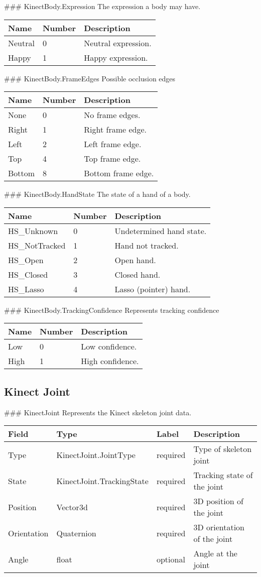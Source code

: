  \#\#\# KinectBody.Expression The expression a body may have.

\begin{longtable}[c]{@{}lll@{}}
\toprule
Name & Number & Description\tabularnewline
\midrule
\endhead
Neutral & 0 & Neutral expression.\tabularnewline
Happy & 1 & Happy expression.\tabularnewline
\bottomrule
\end{longtable}

 \#\#\# KinectBody.FrameEdges Possible occlusion edges

\begin{longtable}[c]{@{}lll@{}}
\toprule
Name & Number & Description\tabularnewline
\midrule
\endhead
None & 0 & No frame edges.\tabularnewline
Right & 1 & Right frame edge.\tabularnewline
Left & 2 & Left frame edge.\tabularnewline
Top & 4 & Top frame edge.\tabularnewline
Bottom & 8 & Bottom frame edge.\tabularnewline
\bottomrule
\end{longtable}

 \#\#\# KinectBody.HandState The state of a hand of a body.

\begin{longtable}[c]{@{}lll@{}}
\toprule
Name & Number & Description\tabularnewline
\midrule
\endhead
HS\_Unknown & 0 & Undetermined hand state.\tabularnewline
HS\_NotTracked & 1 & Hand not tracked.\tabularnewline
HS\_Open & 2 & Open hand.\tabularnewline
HS\_Closed & 3 & Closed hand.\tabularnewline
HS\_Lasso & 4 & Lasso (pointer) hand.\tabularnewline
\bottomrule
\end{longtable}

 \#\#\# KinectBody.TrackingConfidence Represents tracking confidence

\begin{longtable}[c]{@{}lll@{}}
\toprule
Name & Number & Description\tabularnewline
\midrule
\endhead
Low & 0 & Low confidence.\tabularnewline
High & 1 & High confidence.\tabularnewline
\bottomrule
\end{longtable}

\subsection{Kinect Joint}\label{kinectux5fjoint.proto}

 \#\#\# KinectJoint Represents the Kinect skeleton joint data.

\begin{longtable}[c]{@{}llll@{}}
\toprule
Field & Type & Label & Description\tabularnewline
\midrule
\endhead
Type & KinectJoint.JointType & required & Type of skeleton
joint\tabularnewline
State & KinectJoint.TrackingState & required & Tracking state of the
joint\tabularnewline
Position & Vector3d & required & 3D position of the joint\tabularnewline
Orientation & Quaternion & required & 3D orientation of the
joint\tabularnewline
Angle & float & optional & Angle at the joint\tabularnewline
\bottomrule
\end{longtable}

